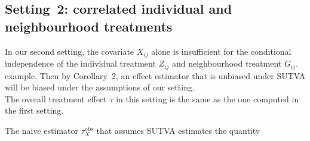 \documentclass[10pt]{article}
\begin{document}
\subsection{Setting~2: correlated individual and neighbourhood treatments}

In our second setting, the covariate $X_{ij}$ alone is insufficient for the conditional independence of the individual treatment $Z_{ij}$ and neighbourhood treatment $G_{ij}$. \todo example. Then by Corollary~2, an effect estimator that is unbiased under SUTVA will be biased under the assumptions of our setting.
\\

The overall treatment effect $\tau$ in this setting is the same as the one computed in the first setting.
\iffalse
\begin{align*}
\tau &= \tau(0)\P(G_{ij}=0) + \tau(1)\P(G_{ij}=1) \\
&= \sum_{x_1,x_2\in\{0,1\}}\left(\tau(0)\P(G_{ij}=0|X_{i1}=x_1,X_{i2}=x_2) + \tau(1)\P(G_{ij}=1|X_{i1}=x_1,X_{i2}=x_2)\right)\P(X_{i1}=x_1,X_{i2}=x_2) \\
&= \frac{1}{4}\left(\tau(0)\left(\frac{1}{2}+\frac{3}{2}\right) + \tau(1)\left(\frac{3}{2}+\frac{1}{2}\right)\right) \\
&= \frac{1}{2}\left(\mu(1,0) + \mu(1,1) - \mu(0,0) - \mu(0,1)\right) \;.
\end{align*}
\fi
The naive estimator $\tau_{X}^\text{obs}$ that assumes SUTVA estimates the quantity
\end{document}
